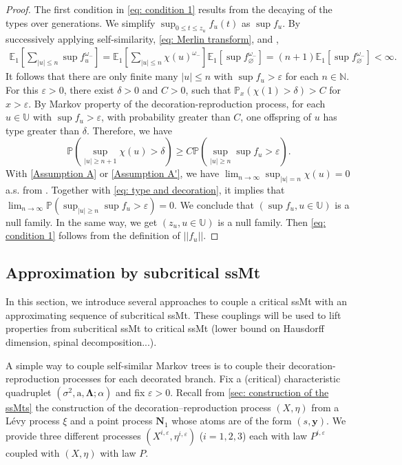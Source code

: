 \documentclass[12pt]{article}
\numberwithin{equation}{section}
\theoremstyle{plain}
\theoremstyle{definition}
\begin{document}
\begin{proof}
The first condition in  \eqref{eq: condition 1} results from the decaying of the types over generations. We simplify $\sup_{0\le t\le z_u} f_u(t)$ as $\sup f_u$. By successively applying self-similarity, \eqref{eq: Merlin transform}, and \cite[Lemma 9.1]{BertoinJean2024SMta},
\begin{align*}
     \mathbb{E}_1\left[ \sum_{|u|\le n}\sup f_{u}^{\omega_-}\right]= \mathbb{E}_1\left[ \sum_{|u|\le n}\chi(u)^{\omega_-} \right]\mathbb{E}_1[\sup f_{\varnothing}^{\omega_-}]=(n+1)\mathbb{E}_1[\sup f_{\varnothing}^{\omega_-}]<\infty.
\end{align*}
It follows that there are only finite many $|u|\le n$ with $\sup f_u > \varepsilon $ for each $n\in \mathbb{N}$. For this $\varepsilon > 0$, there exist $\delta > 0$ and $C>0$, such that $\mathbb{P}_x(\chi(1)>\delta) > C$ for $x>\varepsilon$. By Markov property of the decoration-reproduction process, for each $u\in \mathbb U$ with $\sup f_u > \varepsilon$, with probability greater than $C$, one offspring of $u$ has type greater than $\delta$. Therefore, we have
\begin{equation}\label{eq: type and decoration}
      \mathbb{P}\left(\sup_{|u|\ge n+1}\chi(u)>\delta\right)\ge C \mathbb{P}\left(\sup_{|u|\ge n}\sup f_u>\varepsilon\right).
\end{equation}
With \cref{Assumption A} or \cref{Assumption A'}, we have $\lim_{n\to\infty}\sup_{|u| = n} \chi(u) = 0$ a.s. from  \cite[Lemma 3.1]{ShiZhan2016BRWE}. Together with \eqref{eq: type and decoration}, it implies that $\lim_{n\to \infty}\mathbb{P}(\sup_{|u|\ge n} \sup f_u>\varepsilon)=0$. We conclude that $(\sup f_u,u\in \mathbb{U})$ is a null family. In the same way, we get $(z_u,u\in \mathbb{U})$ is a null family. Then \eqref{eq: condition 1} follows from the definition of $||f_u||$.
\end{proof}


\subsection{Approximation by subcritical ssMt}\label{sec: approximation}
In this section, we introduce several approaches to couple a critical ssMt with an approximating sequence of subcritical ssMt. These couplings will be used to lift properties from subcritical ssMt to critical ssMt (lower bound on Hausdorff dimension, spinal decomposition...).

A simple way to couple self-similar Markov trees is to couple their  decoration-reproduction processes for each decorated branch. Fix a (critical) characteristic quadruplet $(\sigma^2, \mathrm{a}, \boldsymbol\Lambda ; \alpha)$ and fix  $\varepsilon > 0$. Recall from \cref{sec: construction of the ssMts} the construction of the decoration–reproduction process $(X,\eta)$ from a Lévy process $\xi$ and a point process $\mathbf{N}_1$ whose atoms are of the form $(s,\mathbf y)$. We provide three different processes $(X^{i, \varepsilon}, \eta^{i, \varepsilon})$ ($i = 1,2,3$) each with law $P^{i, \varepsilon}$ coupled with $(X, \eta)$ with law $P$.
\end{document}
